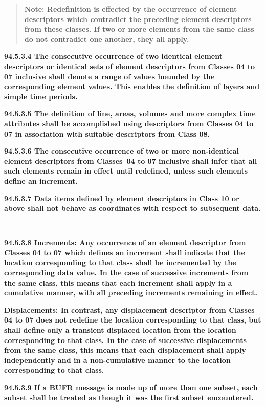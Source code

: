 \begin{quote}
\textbf{Note: Redefinition is effected by the occurrence of element descriptors which contradict the preceding element descriptors from these classes. If two or more elements from the same class do not contradict one another, they all apply.}
\end{quote}

\textbf{94.5.3.4 The consecutive occurrence of two identical element descriptors or identical sets of element descriptors from Classes 04 to 07 inclusive shall denote a range of values bounded by the corresponding element values. This enables the definition of layers and simple time periods.}

\textbf{94.5.3.5 The definition of line, areas, volumes and more complex time attributes shall be accomplished using descriptors from Classes 04 to 07 in association with suitable descriptors from Class 08.}

\textbf{94.5.3.6 The consecutive occurrence of two or more non-identical element descriptors from Classes~04 to 07 inclusive shall infer that all such elements remain in effect until redefined, unless such elements define an increment.}

\textbf{94.5.3.7 Data items defined by element descriptors in Class 10 or above shall not behave as coordinates with respect to subsequent data.}

\textbf{\\
}

\textbf{94.5.3.8 Increments: Any occurrence of an element descriptor from Classes 04 to 07 which defines an increment shall indicate that the location corresponding to that class shall be incremented by the corresponding data value. In the case of successive increments from the same class, this means that each increment shall apply in a cumulative manner, with all preceding increments remaining in effect.}

\textbf{Displacements: In contrast, any displacement descriptor from Classes 04 to 07 does not redefine the location corresponding to that class, but shall define only a transient displaced location from the location corresponding to that class. In the case of successive displacements from the same class, this means that each displacement shall apply independently and in a non-cumulative manner to the location corresponding to that class.}

\textbf{94.5.3.9 If a BUFR message is made up of more than one subset, each subset shall be treated as though it was the first subset encountered.}

